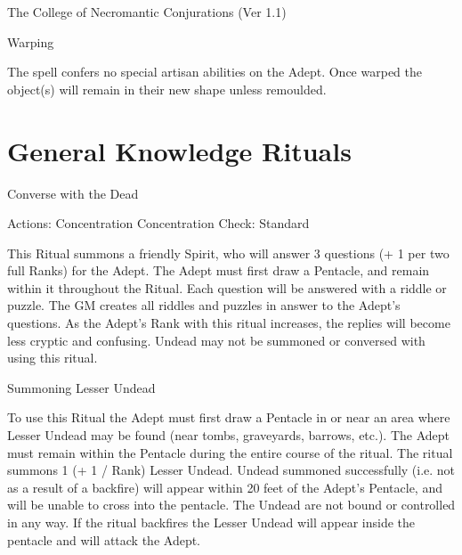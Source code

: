 \begin{Chapter}{The College of Necromantic Conjurations (Ver 1.1)}
\begin{spell}[G-11]{Warping}
\begin{effects}
The spell confers no special artisan abilities on the Adept.  Once
warped the object(s) will remain in their new shape unless remoulded.
\end{effects}
\end{spell}

\section{General Knowledge Rituals}

\begin{ritual}[Q-1]{Converse with the Dead}

Actions: Concentration 
Concentration Check: Standard 
\begin{effects}
This Ritual summons a friendly Spirit, who will answer 3 questions (+
1 per two full Ranks) for the Adept. The Adept must first draw a
Pentacle, and remain within it throughout the Ritual.  Each question
will be answered with a riddle or puzzle.  The GM creates all riddles
and puzzles in answer to the Adept’s questions.  As the Adept’s Rank
with this ritual increases, the replies will become less cryptic and
confusing.  Undead may not be summoned or conversed with using this
ritual.
\end{effects}
\end{ritual}

\begin{ritual}[Q-2]{Summoning Lesser Undead}

\begin{effects}
To use this Ritual the Adept must first draw a Pentacle in or near an
area where Lesser Undead may be found (near tombs, graveyards,
barrows, etc.).  The Adept must remain within the Pentacle during the
entire course of the ritual. The ritual summons 1 (+ 1 / Rank) Lesser
Undead.  Undead summoned successfully (i.e. not as a result of a
backfire) will appear within 20 feet of the Adept’s Pentacle, and will
be unable to cross into the pentacle.  The Undead are not bound or
controlled in any way. If the ritual backfires the Lesser Undead will
appear inside the pentacle and will attack the Adept.
\end{effects}
\end{ritual}


\end{Chapter}
